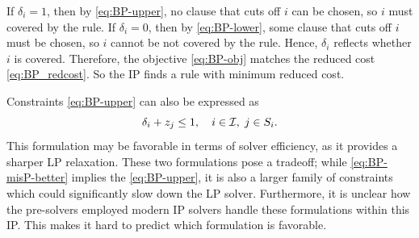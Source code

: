 If $\delta_i = 1$, then by \eqref{eq:BP-upper}, no clause that cuts off $i$ can be chosen, so $i$ must covered by the rule.
If $\delta_i = 0$, then by \eqref{eq:BP-lower}, some clause that cuts off $i$ must be chosen, so $i$ cannot be not covered by the rule.
Hence, $\delta_i$ reflects whether $i$ is covered.
Therefore, the objective \eqref{eq:BP-obj} matches the reduced cost \eqref{eq:BP_redcost}.
So the IP finds a rule with minimum reduced cost.


Constraints \eqref{eq:BP-upper} can also be expressed as
\begin{equation}\label{eq:BP-misP-better}
    \delta_i + z_j \leq 1, \quad i \in \mathcal{I}, \; j \in S_i.
\end{equation}
This formulation may be favorable in terms of solver efficiency, as it provides a sharper LP relaxation.
These two formulations pose a tradeoff; while \eqref{eq:BP-misP-better} implies the \eqref{eq:BP-upper},
it is also a larger family of constraints which could significantly slow down the LP solver.
Furthermore, it is unclear how the pre-solvers employed modern IP solvers handle these formulations within this IP\@.
This makes it hard to predict which formulation is favorable.

